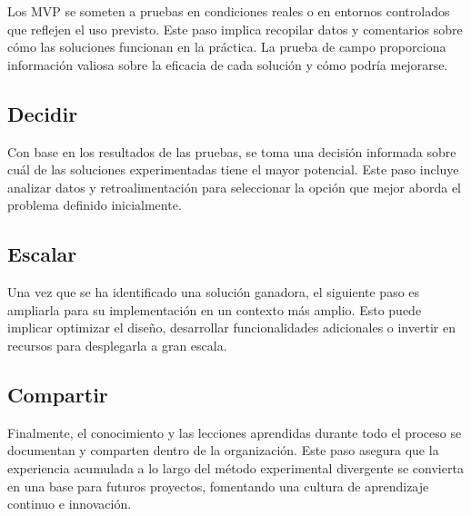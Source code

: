 	Los MVP se someten a pruebas en condiciones reales o en entornos controlados
	que reflejen el uso previsto. Este paso implica recopilar datos y comentarios
	sobre cómo las soluciones funcionan en la práctica. La prueba de campo
	proporciona información valiosa sobre la eficacia de cada solución y cómo
	podría mejorarse.

	\subsection{Decidir}

	Con base en los resultados de las pruebas, se toma una decisión informada sobre
	cuál de las soluciones experimentadas tiene el mayor potencial. Este paso
	incluye analizar datos y retroalimentación para seleccionar la opción que mejor
	aborda el problema definido inicialmente.

	\subsection{Escalar}

	Una vez que se ha identificado una solución ganadora, el siguiente paso es
	ampliarla para su implementación en un contexto más amplio. Esto puede implicar
	optimizar el diseño, desarrollar funcionalidades adicionales o invertir en
	recursos para desplegarla a gran escala.

	\subsection{Compartir}

	Finalmente, el conocimiento y las lecciones aprendidas durante todo el proceso
	se documentan y comparten dentro de la organización. Este paso asegura que la
	experiencia acumulada a lo largo del método experimental divergente se
	convierta en una base para futuros proyectos, fomentando una cultura de
	aprendizaje continuo e innovación.


	\nocite{*} %

	\clearpage
	

	

